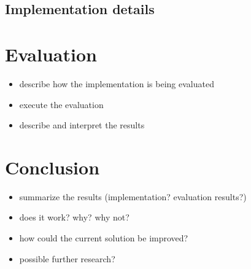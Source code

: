\documentclass{IEEEtran}
\begin{document}
\subsection{Implementation details}
\label{subsec:impldetails}

\section{Evaluation}
\label{sec:evaluation}
\begin{itemize}
	\item describe how the implementation is being evaluated
	\item execute the evaluation
	\item describe and interpret the results
\end{itemize}

\section{Conclusion}
\label{sec:ausblick}
\begin{itemize}
	\item summarize the results (implementation? evaluation results?) 
	\item does it work? why? why not? 
	\item how could the current solution be improved? 
	\item possible further research? 
\end{itemize}

{}
\end{document}
